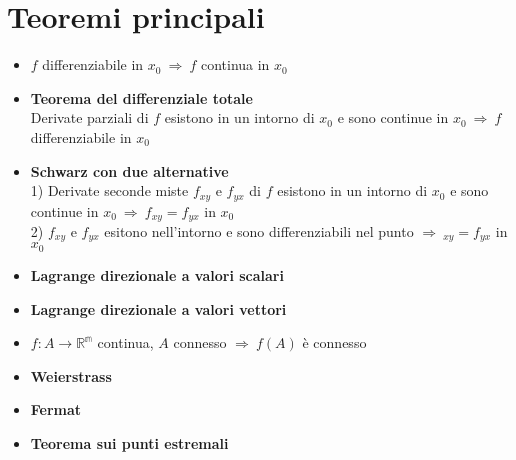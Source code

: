 \documentclass[a4paper,portrait,columns=3,5pt]{cheatsheet}
\begin{document}
\section{Teoremi principali}
\begin{itemize}
	\item $f$ differenziabile in $x_0~ \Rightarrow~f$ continua in $x_0 $
	\item \textbf{Teorema del differenziale totale} \\ Derivate parziali di $f$ esistono in un intorno di $x_0$ e sono continue in $x_0~\Rightarrow ~ f$ differenziabile in $x_0$ 
	\item \textbf{Schwarz con due alternative} \\ 1) Derivate seconde miste $f_{xy}$ e $f_{yx}$ di $f$ esistono in un intorno di $x_0$ e sono continue in $x_0~\Rightarrow~f_{xy} = f_{yx}$ in $x_0$
			\\ 2) $f_{xy}$ e $f_{yx}$ esitono nell'intorno e sono differenziabili nel punto $\Rightarrow~_{xy} = f_{yx}$ in $x_0$
	\item \textbf{Lagrange direzionale a valori scalari} 
	\item \textbf{Lagrange direzionale a valori vettori}
	\item $f : A \rightarrow \mathbb{R^m}$ continua, $A$ connesso $\Rightarrow~f(A)$ è connesso
	\item \textbf{Weierstrass}
	\item \textbf{Fermat}
	\item \textbf{Teorema sui punti estremali}


\end{itemize}
\end{document}
